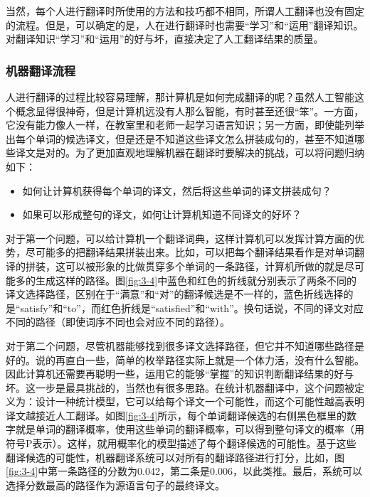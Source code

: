 当然，每个人进行翻译时所使用的方法和技巧都不相同，所谓人工翻译也没有固定的流程。但是，可以确定的是，人在进行翻译时也需要``学习''和``运用''翻译知识。对翻译知识``学习''和``运用''的好与坏，直接决定了人工翻译结果的质量。


\subsubsection{机器翻译流程}

\parinterval 人进行翻译的过程比较容易理解，那计算机是如何完成翻译的呢？虽然人工智能这个概念显得很神奇，但是计算机远没有人那么智能，有时甚至还很``笨''。一方面，它没有能力像人一样，在教室里和老师一起学习语言知识；另一方面，即使能列举出每个单词的候选译文，但是还是不知道这些译文怎么拼装成句的，甚至不知道哪些译文是对的。为了更加直观地理解机器在翻译时要解决的挑战，可以将问题归纳如下：

\begin{itemize}
\vspace{0.5em}
\item 如何让计算机获得每个单词的译文，然后将这些单词的译文拼装成句？
\vspace{0.5em}
\item 如果可以形成整句的译文，如何让计算机知道不同译文的好坏？
\vspace{0.5em}
\end{itemize}

\parinterval 对于第一个问题，可以给计算机一个翻译词典，这样计算机可以发挥计算方面的优势，尽可能多的把翻译结果拼装出来。比如，可以把每个翻译结果看作是对单词翻译的拼装，这可以被形象的比做贯穿多个单词的一条路径，计算机所做的就是尽可能多的生成这样的路径。图\ref{fig:3-4}中蓝色和红色的折线就分别表示了两条不同的译文选择路径，区别在于``满意''和``对''的翻译候选是不一样的，蓝色折线选择的是``satisfy''和``to''，而红色折线是``satisfied''和``with''。换句话说，不同的译文对应不同的路径（即使词序不同也会对应不同的路径）。

\parinterval 对于第二个问题，尽管机器能够找到很多译文选择路径，但它并不知道哪些路径是好的。说的再直白一些，简单的枚举路径实际上就是一个体力活，没有什么智能。因此计算机还需要再聪明一些，运用它的能够``掌握''的知识判断翻译结果的好与坏。这一步是最具挑战的，当然也有很多思路。在统计机器翻译中，这个问题被定义为：设计一种统计模型，它可以给每个译文一个可能性，而这个可能性越高表明译文越接近人工翻译。如图\ref{fig:3-4}所示，每个单词翻译候选的右侧黑色框里的数字就是单词的翻译概率，使用这些单词的翻译概率，可以得到整句译文的概率（用符号P表示）。这样，就用概率化的模型描述了每个翻译候选的可能性。基于这些翻译候选的可能性，机器翻译系统可以对所有的翻译路径进行打分，比如，图\ref{fig:3-4}中第一条路径的分数为0.042，第二条是0.006，以此类推。最后，系统可以选择分数最高的路径作为源语言句子的最终译文。


